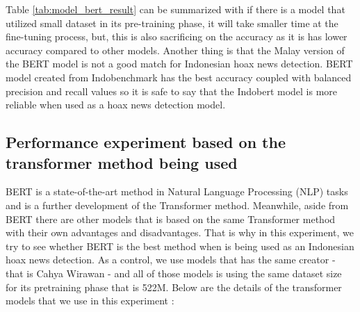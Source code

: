 Table \ref{tab:model_bert_result} can be summarized with if there is a model that utilized small dataset in its pre-training phase, it will take smaller time at the fine-tuning process, but, this is also sacrificing on the accuracy as it is has lower accuracy compared to other models. Another thing is that the Malay version of the BERT model is not a good match for Indonesian hoax news detection. BERT model created from Indobenchmark has the best accuracy coupled with balanced precision and recall values so it is safe to say that the Indobert model is more reliable when used as a hoax news detection model.

\subsection{Performance experiment based on the transformer method being used}

BERT is a state-of-the-art method in Natural Language Processing (NLP) tasks and is a further development of the Transformer method. Meanwhile, aside from BERT there are other models that is based on the same Transformer method with their own advantages and disadvantages. That is why in this experiment, we try to see whether BERT is the best method when is being used as an Indonesian hoax news detection. As a control, we use models that has the same creator - that is Cahya Wirawan - and all of those models is using the same dataset size for its pretraining phase that is 522M. Below are the details of the transformer models that we use in this experiment :

